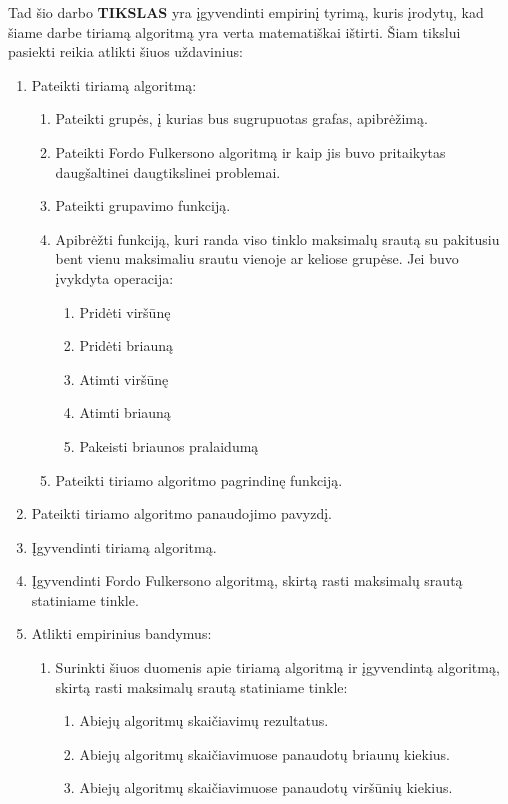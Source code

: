 \newpage

Tad šio darbo \textbf{TIKSLAS} yra įgyvendinti empirinį tyrimą, kuris įrodytų, kad šiame darbe tiriamą algoritmą yra verta matematiškai ištirti. Šiam tikslui pasiekti reikia atlikti šiuos uždavinius:
\begin{enumerate}
	\item Pateikti tiriamą algoritmą:	
	\begin{enumerate}
		\item Pateikti grupės, į kurias bus sugrupuotas grafas, apibrėžimą.
		\item  Pateikti Fordo Fulkersono algoritmą ir kaip jis buvo pritaikytas daugšaltinei daugtikslinei problemai.
		\item Pateikti grupavimo funkciją.
		\item Apibrėžti funkciją, kuri randa viso tinklo maksimalų srautą su pakitusiu bent vienu maksimaliu srautu vienoje ar keliose grupėse. Jei buvo įvykdyta operacija:
		\begin{enumerate}
			\item Pridėti viršūnę
			\item Pridėti briauną
			\item Atimti viršūnę
			\item Atimti briauną
			\item Pakeisti briaunos pralaidumą
		\end{enumerate}
		\item Pateikti tiriamo algoritmo pagrindinę funkciją.
	\end{enumerate}
	\item Pateikti tiriamo algoritmo panaudojimo pavyzdį.
	\item Įgyvendinti tiriamą algoritmą.
	\item Įgyvendinti Fordo Fulkersono algoritmą, skirtą rasti maksimalų srautą statiniame tinkle.
	\item Atlikti empirinius bandymus:
		\begin{enumerate}
			\item Surinkti šiuos duomenis apie tiriamą algoritmą ir įgyvendintą algoritmą, skirtą rasti maksimalų srautą statiniame tinkle:
			\begin{enumerate}
				\item Abiejų algoritmų skaičiavimų rezultatus.
				\item Abiejų algoritmų skaičiavimuose panaudotų briaunų kiekius.
				\item Abiejų algoritmų skaičiavimuose panaudotų viršūnių  kiekius.
			\end{enumerate}

\end{enumerate}
\end{enumerate}
